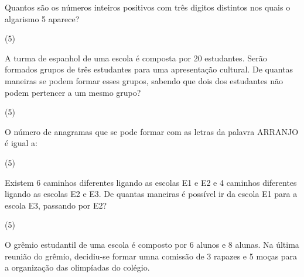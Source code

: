 \documentclass[10pt,a4paper]{article}
\begin{document}
\begin{multicols}{2}
    \begin{question}[type=exam]
        Quantos são os números inteiros positivos com três digitos distintos nos quais
        o algarismo 5 aparece?
        \begin{tasks}(5)
        \end{tasks}
    \end{question}

    \begin{question}[type=exam]
        A turma de espanhol de uma escola é composta por 20 estudantes. Serão
        formados grupos de três estudantes para uma apresentação cultural. De
        quantas maneiras se podem formar esses grupos, sabendo que dois dos
        estudantes não podem pertencer a um mesmo grupo?
        \begin{tasks}(5)
        \end{tasks}
    \end{question}

    \begin{question}[type=exam]
        O número de anagramas que se pode formar com as letras da palavra
        ARRANJO é igual a:
        \begin{tasks}(5)
        \end{tasks}
    \end{question}

    \begin{question}[type=exam]
        Existem 6 caminhos diferentes ligando as escolas E1 e E2 e 4 caminhos
        diferentes ligando as escolas E2 e E3. De quantas maneiras é possível
        ir da escola E1 para a escola E3, passando por E2?

        \begin{taks}(5)
        \end{taks}
    \end{question}

    \begin{question}[type=exam]
        O grêmio estudantil de uma escola é composto por 6 alunos e 8 alunas.
        Na última reunião do grêmio, decidiu-se formar umna comissão de 3
        rapazes e 5 moças para a organização das olimpíadas do colégio.


\end{question}
\end{multicols}
\end{document}
